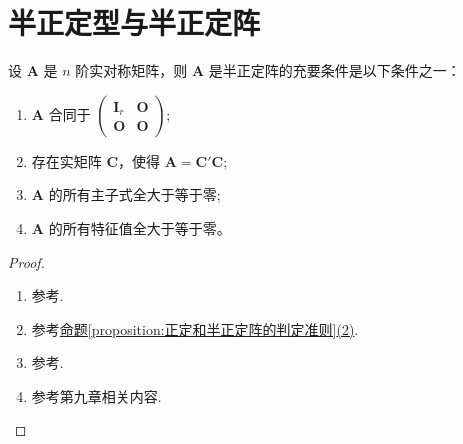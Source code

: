 \documentclass[../../main.tex]{subfiles}
\begin{document}
\section{半正定型与半正定阵}

\begin{proposition}\label{proposition:半正定阵的判定准则123}
设 \(\boldsymbol{A}\) 是 \(n\) 阶实对称矩阵，则 \(\boldsymbol{A}\) 是半正定阵的充要条件是以下条件之一：
\begin{enumerate}[(1)]
\item \(\boldsymbol{A}\) 合同于 \(\begin{pmatrix}\boldsymbol{I}_r&\boldsymbol{O}\\\boldsymbol{O}&\boldsymbol{O}\end{pmatrix}\);

\item 存在实矩阵 \(\boldsymbol{C}\)，使得 \(\boldsymbol{A}=\boldsymbol{C}'\boldsymbol{C}\);

\item \(\boldsymbol{A}\) 的所有主子式全大于等于零;

\item \(\boldsymbol{A}\) 的所有特征值全大于等于零。
\end{enumerate}
\end{proposition}
\begin{proof}
\begin{enumerate}[(1)]
\item 参考.

\item 参考\hyperref[proposition:正定和半正定阵的判定准则]{命题\ref{proposition:正定和半正定阵的判定准则}(2)}.

\item 参考.

\item 参考第九章相关内容.
\end{enumerate}
\end{proof}
\end{document}
